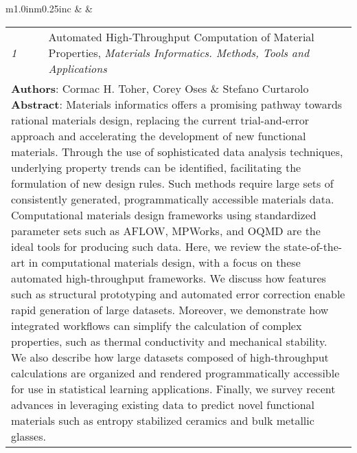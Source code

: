 \documentclass[11pt]{article}
\begin{document}
\vspace{0.25cm}

\noindent\hspace{0cm}{\Large 2016}

\vspace{0.25cm}

\begin{tabular}{m{1.0in}m{0.25in}c}
 & & 
\begin{tabular}{m{0.3in}m{0.15in}m{4.3in}}
\textit{\small{1}} & & Automated High-Throughput Computation of Material Properties, \textit{Materials Informatics. Methods, Tools and Applications} \\ \multicolumn{3}{p{4.75in}}{\footnotesize{\textbf{Authors}: Cormac H. Toher, \textcolor{NavyBlue}{Corey Oses} \& Stefano Curtarolo \newline \textbf{Abstract}: Materials informatics offers a promising pathway towards rational materials design, replacing the current trial-and-error approach and accelerating the development of new functional materials. Through the use of sophisticated data analysis techniques, underlying property trends can be identified, facilitating the formulation of new design rules. Such methods require large sets of consistently generated, programmatically accessible materials data. Computational materials design frameworks using standardized parameter sets such as {\small AFLOW}, MPWorks, and OQMD are the ideal tools for producing such data. Here, we review the state-of-the-art in computational materials design, with a focus on these automated high-throughput frameworks.  We discuss how features such as structural prototyping and automated error correction enable rapid generation of large datasets. Moreover, we demonstrate how integrated workflows can simplify the calculation of complex properties, such as thermal conductivity and mechanical stability. We also describe how large datasets composed of high-throughput calculations are organized and rendered programmatically accessible for use in statistical learning applications. Finally, we survey recent advances in leveraging existing data to predict novel functional materials such as entropy stabilized ceramics and bulk metallic glasses.}} 
\end{tabular} \\ 
\end{tabular}
\end{document}
